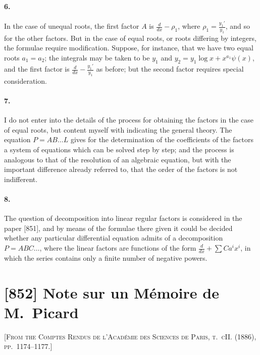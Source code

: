 \documentclass[11pt,a4paper]{book}
\begin{document}
\paragraph{6.} In the case of unequal roots, the first factor $A$ is $\frac{d}{dx} - \rho_{1}$, where $\rho_{1} = \frac{y_{1}'}{y_{1}}$, and so for the other factors. But in the case of equal roots, or roots differing by integers, the formulae require modification. Suppose, for instance, that we have two equal roots $a_{1} = a_{2}$; the integrals may be taken to be $y_{1}$ and $y_{2} = y_{1}\log x + x^{a_{1}}\psi(x)$, and the first factor is $\frac{d}{dx} - \frac{y_{1}'}{y_{1}}$ as before; but the second factor requires special consideration.

\paragraph{7.} I do not enter into the details of the process for obtaining the factors in the case of equal roots, but content myself with indicating the general theory. The equation $P = AB\ldots L$ gives for the determination of the coefficients of the factors a system of equations which can be solved step by step; and the process is analogous to that of the resolution of an algebraic equation, but with the important difference already referred to, that the order of the factors is not indifferent.

\paragraph{8.} The question of decomposition into linear regular factors is considered in the paper [851], and by means of the formulae there given it could be decided whether any particular differential equation admits of a decomposition $P = ABC\ldots$, where the linear factors are functions of the form $\frac{d}{dx} + \sum Ca^{i}x^{i}$, in which the series contains only a finite number of negative powers.

\newpage
\section*{[852] Note sur un M\'{e}moire de M.\ Picard}

\noindent\textsc{[From the Comptes Rendus de l'Acad\'{e}mie des Sciences de Paris, t.~cII. (1886), pp.~1174--1177.]}
\end{document}
